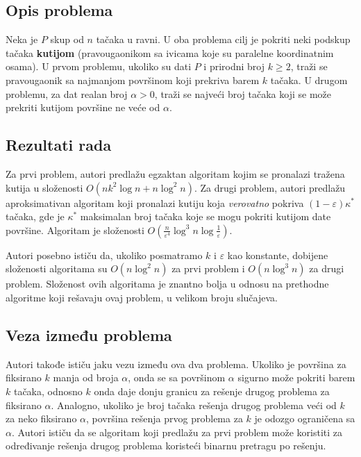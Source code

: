 \documentclass[a4paper]{article}
\begin{document}
\subsection{Opis problema}

Neka je $P$ skup od $n$ tačaka u ravni. U oba problema cilj je pokriti neki podskup tačaka \textbf{kutijom} (pravougaonikom sa ivicama koje su paralelne koordinatnim osama). U prvom problemu, ukoliko su dati $P$ i prirodni broj $k \geqslant 2$, traži se pravougaonik sa najmanjom površinom koji prekriva barem $k$ tačaka. U drugom problemu, za dat realan broj $\alpha > 0$, traži se najveći broj tačaka koji se može prekriti
kutijom površine ne veće od $\alpha$.

\subsection{Rezultati rada}

Za prvi problem, autori predlažu egzaktan algoritam kojim se pronalazi tražena kutija u složenosti $O \left( n k^2 \log n + n \log^2 n \right)$.
Za drugi problem, autori predlažu aproksimativan algoritam koji pronalazi kutiju koja {\em verovatno} pokriva $(1 - \varepsilon) \kappa^\ast$ tačaka,
gde je $\kappa^\ast$ maksimalan broj tačaka koje se mogu pokriti kutijom date površine. Algoritam je složenosti
$O \left( \frac{n}{\varepsilon^4} \log^3 n \log \frac{1}{\varepsilon} \right)$.

Autori posebno ističu da, ukoliko posmatramo $k$ i $\varepsilon$ kao konstante, dobijene složenosti algoritama su
$O (n \log^2 n)$ za prvi problem i $O (n \log^3 n)$ za drugi problem. Složenost ovih algoritama je znantno bolja u odnosu na prethodne algoritme koji rešavaju ovaj problem, u velikom broju slučajeva.

\subsection{Veza između problema}

Autori takođe ističu jaku vezu između ova dva problema. Ukoliko je površina za fiksirano $k$ manja od broja $\alpha$, onda se sa površinom $\alpha$ sigurno može pokriti barem $k$ tačaka, odnosno $k$ onda daje donju granicu za rešenje drugog problema za fiksirano $\alpha$.
Analogno, ukoliko je broj tačaka rešenja drugog problema veći od $k$ za neko fiksirano $\alpha$, površina rešenja prvog problema za $k$ je odozgo ograničena sa $\alpha$. Autori ističu da se algoritam koji predlažu za prvi problem može koristiti za određivanje rešenja drugog problema koristeći binarnu pretragu po rešenju.
\end{document}
